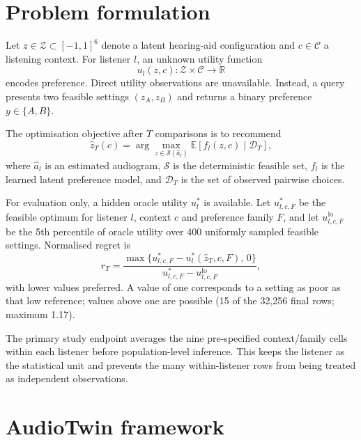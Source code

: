 \documentclass[preprint,12pt]{elsarticle}
\begin{document}
\section{Problem formulation}
\label{sec:problem}

Let $z\in\mathcal Z\subset[-1,1]^6$ denote a latent hearing-aid configuration and $c\in\mathcal C$ a listening context. For listener $l$, an unknown utility function
\begin{equation}
    u_l(z,c):\mathcal Z\times\mathcal C\rightarrow\mathbb R
\end{equation}
encodes preference. Direct utility observations are unavailable. Instead, a query presents two feasible settings $(z_A,z_B)$ and returns a binary preference $y\in\{A,B\}$.

The optimisation objective after $T$ comparisons is to recommend
\begin{equation}
    \hat z_T(c)=\arg\max_{z\in\mathcal S(\hat a_l)} \mathbb E[f_l(z,c)\mid\mathcal D_T],
    \label{eq:recommend}
\end{equation}
where $\hat a_l$ is an estimated audiogram, $\mathcal S$ is the deterministic feasible set, $f_l$ is the learned latent preference model, and $\mathcal D_T$ is the set of observed pairwise choices.

For evaluation only, a hidden oracle utility $u_l^*$ is available. Let $u^*_{l,c,F}$ be the feasible optimum for listener $l$, context $c$ and preference family $F$, and let $u^{\mathrm{lo}}_{l,c,F}$ be the 5th percentile of oracle utility over 400 uniformly sampled feasible settings. Normalised regret is
\begin{equation}
    r_T = \frac{\max\{u^*_{l,c,F}-u_l^*(\hat z_T,c,F),\,0\}}{u^*_{l,c,F}-u^{\mathrm{lo}}_{l,c,F}},
    \label{eq:regret}
\end{equation}
with lower values preferred. A value of one corresponds to a setting as poor as that low reference; values above one are possible (15 of the 32,256 final rows; maximum 1.17).

The primary study endpoint averages the nine pre-specified context/family cells within each listener before population-level inference. This keeps the listener as the statistical unit and prevents the many within-listener rows from being treated as independent observations.

\section{AudioTwin framework}
\label{sec:framework}
\end{document}
